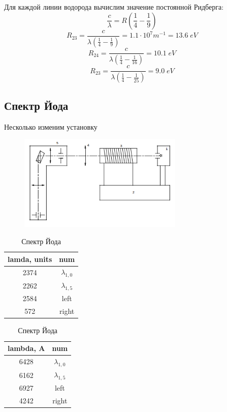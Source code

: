 \documentclass{article}
\begin{document}
Для каждой линии водорода вычислим значение постоянной Ридберга:
\[ \frac{c}{\lambda} = R \left( \frac{1}{4} - \frac{1}{9} \right) \]
\[ R_{23} = \frac{c}{\lambda\left( \frac{1}{4} - \frac{1}{9} \right)} = 1.1\cdot10^{7} m^{-1} = 13.6\;eV \]
\[ R_{24} = \frac{c}{\lambda\left( \frac{1}{4} - \frac{1}{16} \right)} = 10.1\;eV \]
\[ R_{23} = \frac{c}{\lambda\left( \frac{1}{4} - \frac{1}{25} \right)} = 9.0\;eV  \]
\subsection{Спектр Йода}
Несколько изменим установку

\begin{figure}[H]
	\centering
	\includegraphics[width=0.7\textwidth]{scheme-iodine.png}
\end{figure}

\begin{table}[H]
	\centering
\begin{tabular}{|c|c|}
	\hline
lamda, units & num							\\\hline
	2374         & \(\lambda_{1,0}\) \\\hline
2262         &  \(\lambda_{1,5}\)	\\\hline
2584         & left							\\\hline
572          & right						\\\hline
\end{tabular}
	\caption{Спектр Йода}
\end{table}

\begin{table}[H]
	\centering
\begin{tabular}{|c|c|}
	\hline
lambda, A         & num \\\hline
6428 & \(\lambda_{1,0}\)   \\\hline
6162 & \(\lambda_{1,5}\)   \\\hline
6927 & left					    \\\hline
4242 & right						\\\hline
\end{tabular}
	\caption{Спектр Йода}
\end{table}
\end{document}
